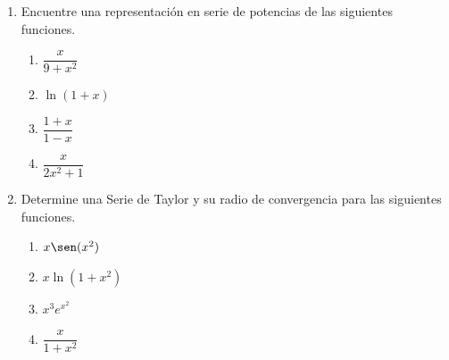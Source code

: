 \documentclass{article}
\begin{document}
\begin{enumerate}
\begin{enumerate}
    \item $\displaystyle\sum_{n=1}^{\infty} \frac{(x-3)^n}{n^n}$
    \item $\displaystyle\sum_{n=1}^{\infty} \frac{(5x-4)^n}{n^3}$
    \item $\displaystyle\sum_{n=0}^{\infty} \frac{(-1)^n}{(2n+1)!}x^n$
  \end{enumerate}
  \vspace{2mm}
  \newpage
  \item Encuentre una representación en serie de potencias de las siguientes funciones.
  \begin{enumerate}
    \item $\dfrac{x}{9+x^2}$
    \item $\ln(1+x)$
    \item $\dfrac{1+x}{1-x}$
    \item $\dfrac{x}{2x^2+1}$
  \end{enumerate}
  \vspace{2mm}
  \item Determine una Serie de Taylor y su radio de convergencia para las siguientes funciones.
    \begin{enumerate}
      \item $x\sen(x^2)$
      \item $x\ln(1+x^2)$
      \item $x^3e^{x^2}$
      \item $\dfrac{x}{1+x^2}$
    \end{enumerate}
\end{enumerate}
\end{document}
